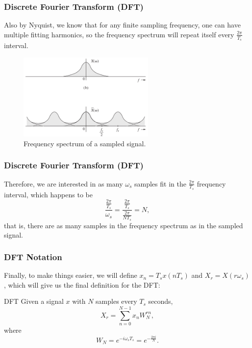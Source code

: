 \documentclass{beamer}
\begin{document}
\begin{frame}
    \frametitle{Discrete Fourier Transform (DFT)}
    Also by Nyquist, we know that for any finite sampling frequency, one can have multiple fitting harmonics, so the frequency spectrum will repeat itself every $\frac{2\pi}{T_s}$ interval.
    \begin{figure}[H]
        \centering
        \includegraphics[width=0.6\textwidth]{frequency_spectrum_repeating.png}
        \caption{Frequency spectrum of a sampled signal.}
        \label{fig:frequency_spectrum_repeating-pn}
    \end{figure}
\end{frame}

\begin{frame}
    \frametitle{Discrete Fourier Transform (DFT)}
    Therefore, we are interested in as many $\omega_s$ samples fit in the $\frac{2\pi}{T_s}$ frequency interval, which happens to be \[
    \frac{\frac{2\pi}{T_s}}{\omega_s} =\frac{\frac{2\pi}{T_s}}{\frac{2\pi}{N T_s}} = N
    ,\] that is, there are as many samples in the frequency spectrum as in the sampled signal.
\end{frame}

\begin{frame}
    \frametitle{DFT Notation}
    Finally, to make things easier, we  will define $x_n = T_s x\left( n T_s \right)$ and $X_r = X\left( r \omega_s \right) $, which will give us the final definition for the DFT:
    \begin{exampleblock}{DFT}
        Given a signal $x$ with $N$ samples every $T_s$ seconds, \[
        X_r = \sum_{n=0}^{N-1} x_{n} W_N^{r n}
        ,\] where \[
	    W_N = e^{-i\omega_s T_s} = e^{-\frac{2\pi i}{N}}
        .\] 
    \end{exampleblock}
\end{frame}
\end{document}
